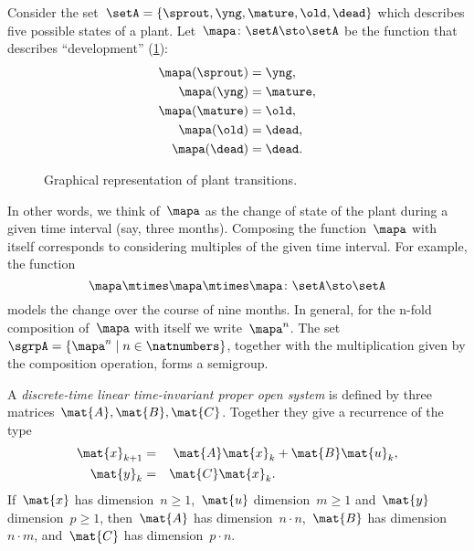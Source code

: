 \begin{example}
    \label{exa:plant-trafo-semigroup}
    Consider the set~$\setA = \{ \sprout, \yng, \mature, \old, \dead \}$ which describes five possible states of a plant.
    Let~$\mapa \colon \setA \sto \setA$ be the function that describes ``development'' (\cref{fig:plants_transitions}):
    \begin{align*}
        \mapa(\sprout) & =  \yng,    \\
        \mapa(\yng)    & =  \mature, \\
        \mapa(\mature) & =  \old,    \\
        \mapa( \old)   & = \dead,    \\
        \mapa (\dead)  & = \dead.
    \end{align*}
    \begin{figure}[h!]
        \caption{Graphical representation of plant transitions.}
        \label{fig:plants_transitions}
    \end{figure}
    In other words, we think of~$\mapa$ as the change of state of the plant during a given time interval (say, three months).
    Composing the function~$\mapa$ with itself corresponds to considering multiples of the given time interval.
    For example, the function
    \begin{equation*}
        \mapa \mtimes \mapa \mtimes \mapa \colon \setA \sto \setA
    \end{equation*}
    models the change over the course of nine months.
    In general, for the n-fold composition of~$\mapa$ with itself we write~$\mapa^n$.
    The set~$\sgrpA = \{ \mapa^n \mid n \in \natnumbers \}$, together with the multiplication given by the composition operation, forms a semigroup.
\end{example}

\label{ex:discrete-time-linear}
\begin{definition}
    \label{def:discrete-time-linear-system}
    A \emph{discrete-time linear time-invariant proper open system} is defined by three matrices~$\mat{A},\mat{B},\mat{C}$.
    Together they give a recurrence of the type
    \begin{equation}
        \label{eq:discrete-time-dynamics}
        \begin{aligned}
            \mat{x}_{k+1} & = & \mat{A} \mat{x}_k  & + \mat{B} \mat{u}_k, \\
            \mat{y}_{k}   & = & \mat{C} \mat{x}_k.
            \\
        \end{aligned}
    \end{equation}
    If~$\mat{x}$ has dimension~$n\geq1$,~$\mat{u}$ dimension~$m\geq1$ and~$\mat{y}$ dimension~$p\geq1$, then~$\mat{A}$ has dimension~$n \cdot n$,~$\mat{B}$ has dimension~$n \cdot m$, and~$\mat{C}$ has dimension~$p \cdot n$.
\end{definition}

